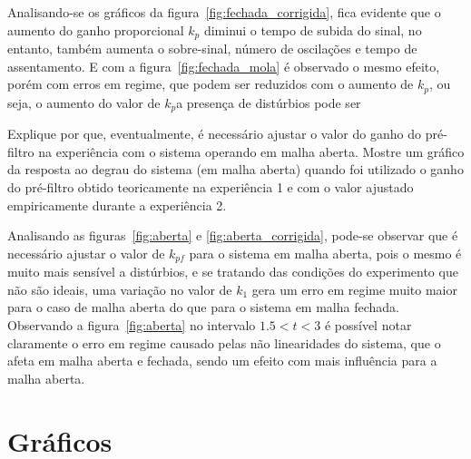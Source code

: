 \documentclass{ZenTera}
\begin{document}
\begin{questions}
    \begin{solution}
    Analisando-se os gráficos da figura~\ref{fig:fechada_corrigida}, fica evidente que o aumento do ganho proporcional $k_p$ diminui o tempo de subida do sinal, no entanto, também aumenta o sobre-sinal, número de oscilações e tempo de assentamento. E com a figura~\ref{fig:fechada_mola} é observado o mesmo efeito, porém com erros em regime, que podem ser reduzidos com o aumento de $k_p$, ou seja, o aumento do valor de $k_p$a presença de distúrbios pode ser 
    \end{solution}
    
\question Explique por que, eventualmente, é necessário ajustar o valor do ganho do pré-filtro na experiência com o sistema operando em malha aberta. 
Mostre um gráfico da resposta ao degrau do sistema (em malha aberta) quando foi utilizado o ganho do pré-filtro obtido teoricamente na experiência 1 e com o valor ajustado empiricamente durante a experiência 2.

    \begin{solution}
    Analisando as figuras~\ref{fig:aberta} e \ref{fig:aberta_corrigida}, pode-se observar que é necessário ajustar o valor de $k_{pf}$ para o sistema em malha aberta, pois o mesmo é muito mais sensível a distúrbios, e se tratando das condições do experimento que não são ideais, uma variação no valor de $k_1$ gera um erro em regime muito maior para o caso de malha aberta do que para o sistema em malha fechada.
    Observando a figura~\ref{fig:aberta} no intervalo $1.5<t<3$ é possível notar claramente o erro em regime causado pelas não linearidades do sistema, que o afeta em malha aberta e fechada, sendo um efeito com mais influência para a malha aberta. 
    
    
    
    \end{solution}

\end{questions}

\appendix

\section{Gráficos}

\end{document}
